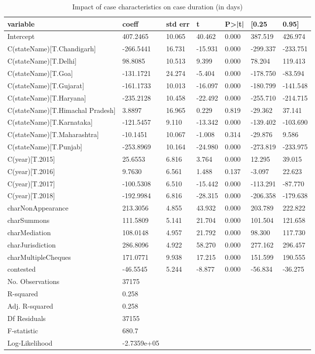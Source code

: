 \begin{longtable}{@{}lllllll@{}}
\caption{Impact of case characteristics on case duration (in days)}
\label{tab:duration_reg}\\
\toprule
variable & coeff & std err & t & P>|t| & [0.25 & 0.95] \\\midrule
\endhead
Intercept & 407.2465 & 10.065 & 40.462 & 0.000 & 387.519 & 426.974 \\
C(stateName)[T.Chandigarh] & -266.5441 & 16.731 & -15.931 & 0.000 & -299.337 & -233.751 \\
C(stateName)[T.Delhi] & 98.8085 & 10.513 & 9.399 & 0.000 & 78.204 & 119.413 \\
C(stateName)[T.Goa] & -131.1721 & 24.274 & -5.404 & 0.000 & -178.750 & -83.594 \\
C(stateName)[T.Gujarat] & -161.1733 & 10.013 & -16.097 & 0.000 & -180.799 & -141.548 \\
C(stateName)[T.Haryana] & -235.2128 & 10.458 & -22.492 & 0.000 & -255.710 & -214.715 \\
C(stateName)[T.Himachal Pradesh] & 3.8897 & 16.965 & 0.229 & 0.819 & -29.362 & 37.141 \\
C(stateName)[T.Karnataka] & -121.5457 & 9.110 & -13.342 & 0.000 & -139.402 & -103.690 \\
C(stateName)[T.Maharashtra] & -10.1451 & 10.067 & -1.008 & 0.314 & -29.876 & 9.586 \\
C(stateName)[T.Punjab] & -253.8969 & 10.164 & -24.980 & 0.000 & -273.819 & -233.975 \\
C(year)[T.2015] & 25.6553 & 6.816 & 3.764 & 0.000 & 12.295 & 39.015 \\
C(year)[T.2016] & 9.7630 & 6.561 & 1.488 & 0.137 & -3.097 & 22.623 \\
C(year)[T.2017] & -100.5308 & 6.510 & -15.442 & 0.000 & -113.291 & -87.770 \\
C(year)[T.2018] & -192.9984 & 6.816 & -28.315 & 0.000 & -206.358 & -179.638 \\
charNonAppearance & 213.3056 & 4.855 & 43.932 & 0.000 & 203.789 & 222.822 \\
charSummons & 111.5809 & 5.141 & 21.704 & 0.000 & 101.504 & 121.658 \\
charMediation & 108.0148 & 4.957 & 21.792 & 0.000 & 98.300 & 117.730 \\
charJurisdiction & 286.8096 & 4.922 & 58.270 & 0.000 & 277.162 & 296.457 \\
charMultipleCheques & 171.0771 & 9.938 & 17.215 & 0.000 & 151.599 & 190.555 \\
contested & -46.5545 & 5.244 & -8.877 & 0.000 & -56.834 & -36.275\\
\bottomrule
No. Observations & 37175 & & & & &\\
R-squared & 0.258 & & & & & \\
Adj. R-squared& 0.258& & & & & \\
Df Residuals& 37155 & & & & &\\
F-statistic & 680.7 & & & & & \\
Log-Likelihood & -2.7359e+05 & & & & & \\
\bottomrule
\end{longtable}

